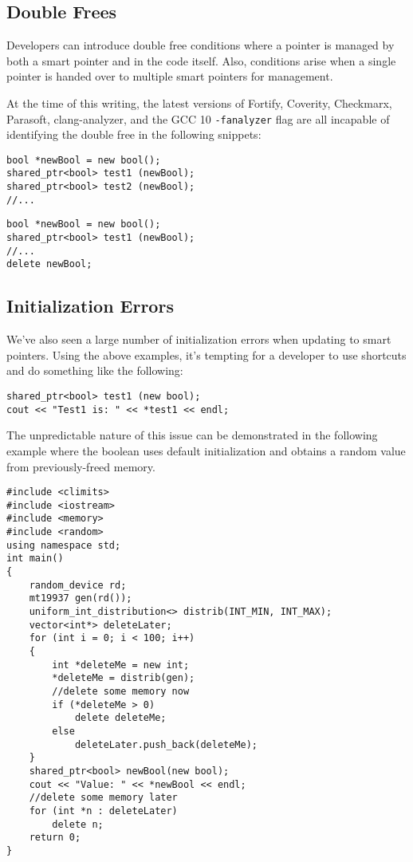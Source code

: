 \subsection{Double Frees}

Developers can introduce double free conditions where a pointer is managed by both a smart pointer and in the code itself. Also, conditions arise when a single pointer is handed over to multiple smart pointers for management.

At the time of this writing, the latest versions of Fortify, Coverity, Checkmarx, Parasoft, clang-analyzer, and the GCC 10 \texttt{-fanalyzer} flag are all incapable of identifying the double free in the following snippets:

\begin{lstlisting}[caption={Double Smart Pointer},captionpos=b,style=CStyle,basicstyle=\small]
bool *newBool = new bool();
shared_ptr<bool> test1 (newBool);
shared_ptr<bool> test2 (newBool);
//...
\end{lstlisting}

\begin{lstlisting}[caption={Smart and Dumb Pointer},captionpos=b,style=CStyle,basicstyle=\small]
bool *newBool = new bool();
shared_ptr<bool> test1 (newBool);
//...
delete newBool;
\end{lstlisting}

\subsection{Initialization Errors}

We've also seen a large number of initialization errors when updating to smart pointers. Using the above examples, it's tempting for a developer to use shortcuts and do something like the following:

\begin{lstlisting}[caption={Uninitialized Boolean},captionpos=b,style=CStyle,basicstyle=\small]
shared_ptr<bool> test1 (new bool);
cout << "Test1 is: " << *test1 << endl;
\end{lstlisting}

The unpredictable nature of this issue can be demonstrated in the following example where the boolean uses default initialization and obtains a random value from previously-freed memory.

\begin{lstlisting}[caption={Uninitialized Boolean},captionpos=b,style=CStyle,basicstyle=\small]
#include <climits>
#include <iostream>
#include <memory>
#include <random>
using namespace std;
int main()
{
	random_device rd;
	mt19937 gen(rd());
	uniform_int_distribution<> distrib(INT_MIN, INT_MAX);
	vector<int*> deleteLater;
	for (int i = 0; i < 100; i++)
	{
		int *deleteMe = new int;
		*deleteMe = distrib(gen);
		//delete some memory now
		if (*deleteMe > 0)
			delete deleteMe;
		else
			deleteLater.push_back(deleteMe);
	}
	shared_ptr<bool> newBool(new bool);
	cout << "Value: " << *newBool << endl;
	//delete some memory later
	for (int *n : deleteLater)
		delete n;
	return 0;
}
\end{lstlisting}

